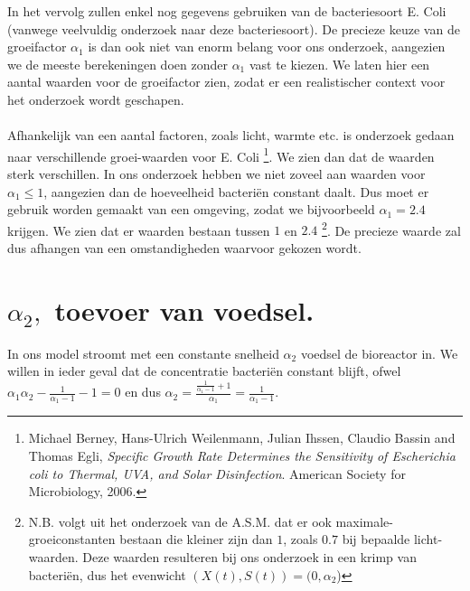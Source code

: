 In het vervolg zullen enkel nog gegevens gebruiken van de bacteriesoort E. Coli (vanwege veelvuldig onderzoek naar deze bacteriesoort). De precieze keuze van de groeifactor $\alpha_1$ is dan ook niet van enorm belang voor ons onderzoek, aangezien we de meeste berekeningen doen zonder $\alpha_1$ vast te kiezen. We laten hier een aantal waarden voor de groeifactor zien, zodat er een realistischer context voor het onderzoek wordt geschapen. 
\\
\\
Afhankelijk van een aantal factoren, zoals licht, warmte etc. is onderzoek gedaan naar verschillende groei-waarden voor E. Coli \footnote{Michael Berney, Hans-Ulrich Weilenmann, Julian Ihssen, Claudio Bassin and Thomas Egli,
  \emph{Specific Growth Rate Determines the Sensitivity of Escherichia coli to Thermal, UVA, and Solar Disinfection}.
  American Society for Microbiology, 
  2006.}. We zien dan dat de waarden sterk verschillen. In ons onderzoek hebben we niet zoveel aan waarden voor $\alpha_1\leq1$, aangezien dan de hoeveelheid bacteri\"en constant daalt. Dus moet er gebruik worden gemaakt van een omgeving, zodat we bijvoorbeeld $\alpha_1 = 2.4$ krijgen. We zien dat er waarden bestaan tussen $1$ en $2.4$ \footnote{N.B. volgt uit het onderzoek van de A.S.M. dat er ook maximale-groeiconstanten bestaan die kleiner zijn dan $1$, zoals $0.7$ bij bepaalde licht-waarden. Deze waarden resulteren bij ons onderzoek in een krimp van bacteri\"en, dus het evenwicht $(X(t), S(t)) = (0, \alpha_2$) }. De precieze waarde zal dus afhangen van een omstandigheden waarvoor gekozen wordt.


\section{$\alpha_2,$ toevoer van voedsel.}
In ons model stroomt met een constante snelheid $\alpha_2$ voedsel de bioreactor in. We willen in ieder geval dat de concentratie bacteri\"en constant blijft, ofwel $\alpha_1\alpha_2-\frac{1}{\alpha_1-1}-1 = 0$ en dus $\alpha_2 = \frac{\frac{1}{\alpha_1-1}+1}{\alpha_1}=\frac{1}{\alpha_1-1}$.

